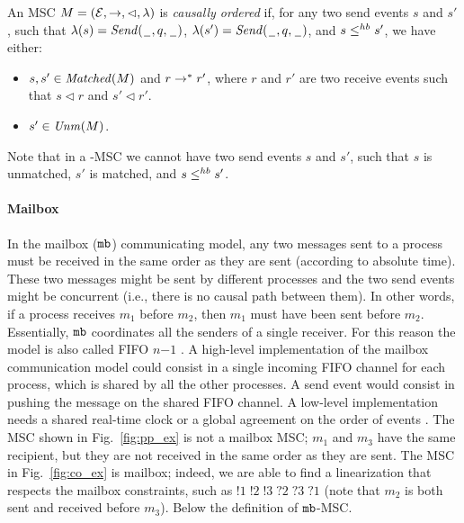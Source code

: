 \begin{definition}[\co-MSC]\label{def:co_msc}
	An MSC $M = (\mathcal{E},\to,\lhd,\lambda)$ is \emph{causally ordered} if, for any two send events $s$ and $s'$, such that $\lambda(s)={\mathit{Send}(\hspace{0.1em}\underline{\hspace{0.5em}}\hspace{0.1em},q,\hspace{0.1em}\underline{\hspace{0.5em}}\hspace{0.1em})}$, $\lambda(s')={\mathit{Send}(\hspace{0.1em}\underline{\hspace{0.5em}}\hspace{0.1em},q,\hspace{0.1em}\underline{\hspace{0.5em}}\hspace{0.1em})}$, and $s \leq^{hb} s'$, we have either:
	\begin{itemize}%
		\item $s,s' \in \mathit{Matched}(M)$ and $r \to^* r'$, where $r$ and $r'$ are two receive events such that $s \lhd r$ and $s' \lhd r'$.
		\item $s' \in \mathit{Unm}(M)$.
	\end{itemize}
\end{definition}

Note that in a \co-MSC we cannot have two send events $s$ and $s'$, such that $s$ is unmatched, $s'$ is matched, and $s \leq^{hb} s'$.

\paragraph{\bf Mailbox}
In the mailbox ($\mathtt{mb}$) communicating model, any two messages sent to a process  must be received in the same order as they are sent (according to absolute time). These two messages might be sent by different processes and the two send events might be concurrent (i.e., there is no causal path between them). In other words, if a process  receives $m_1$ before $m_2$, then $m_1$ must have been sent before $m_2$. Essentially, $\mathtt{mb}$ coordinates all the senders of a single receiver. For this reason the model is also called FIFO $n\mathsf{-}1$ \cite{DBLP:journals/fac/ChevrouHQ16}.   A high-level implementation of the mailbox communication model could consist in a single incoming FIFO channel for each process, which is shared by all the other processes. A send event would consist in pushing the message on the shared FIFO channel.
A low-level implementation needs a shared real-time clock \cite{cristian1999timed} or a global agreement on the order of events \cite{defago2004total, raynal2010communication}.
The MSC shown in Fig.~\ref{fig:pp_ex} is not a mailbox MSC; $m_1$ and $m_3$ have the same recipient, but they are not received in the same order as they are sent. The MSC in Fig.~\ref{fig:co_ex} is mailbox; indeed, we are able to find a linearization that respects the mailbox constraints, such as $!1\;!2\;!3\;?2\;?3\;?1$ (note that $m_2$ is both sent and received before $m_3$). Below the definition of $\mathtt{mb}$-MSC.

